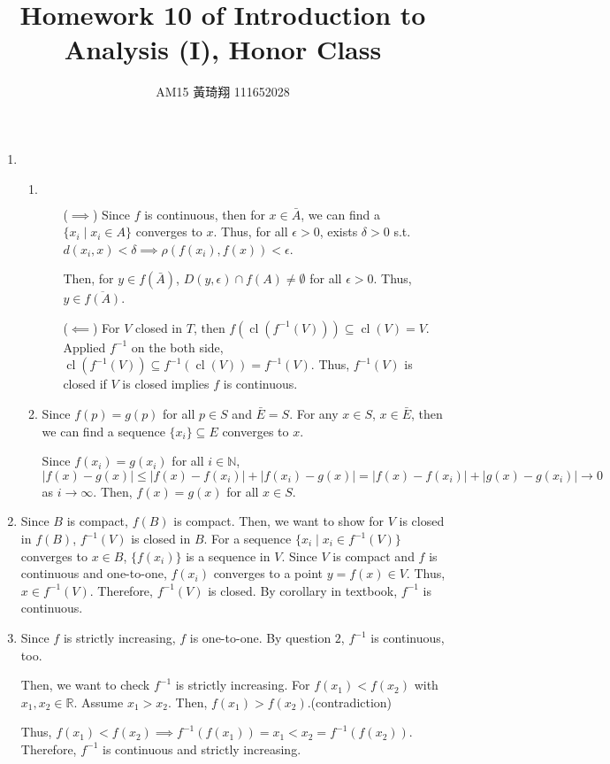 \documentclass[12pt]{article}
\title{Homework 10 of Introduction to Analysis (I), Honor Class}
\author{AM15 黃琦翔 111652028}
\DeclareMathOperator{\closure}{cl}
\begin{document}
\maketitle
\begin{enumerate}
    \item \begin{enumerate}
        \item $\ $
        \begin{enumerate}
            \item[($\implies$)] Since $f$ is continuous, then for $x\in \bar{A}$, 
            we can find a $\lbrace x_i\mid x_i\in A\rbrace$ converges to $x$.
            Thus, for all $\epsilon > 0$, exists $\delta > 0$ s.t. $d(x_i, x) < \delta \implies \rho(f(x_i), f(x)) < \epsilon$.

            Then, for $y \in f(\bar{A})$, $D(y, \epsilon)\cap f(A) \neq \emptyset$ for all $\epsilon > 0$.
            Thus, $y \in \overline{f(A)}$.
            
            \item[($\impliedby$)] For $V$ closed in $T$, then $f(\closure(f^{-1}(V))) \subseteq \closure(V) = V$.
            Applied $f^{-1}$ on the both side, $\closure(f^{-1}(V)) \subseteq f^{-1}(\closure(V)) = f^{-1}(V)$.
            Thus, $f^{-1}(V)$ is closed if $V$ is closed implies $f$ is continuous.           

        \end{enumerate}

        \item Since $f(p) = g(p)$ for all $p \in S$ and $\bar{E} = S$.
        For any $x\in S$, $x\in \bar{E}$, then we can find a sequence $\lbrace x_i\rbrace\subseteq E$ converges to $x$.

        Since $f(x_i) = g(x_i)$ for all $i\in \mathbb{N}$, $|f(x) - g(x)| \leq |f(x) - f(x_i)| + |f(x_i) - g(x)| = |f(x) - f(x_i)| + |g(x)- g(x_i)| \to 0$ as $i\to \infty$.
        Then, $f(x) = g(x)$ for all $x\in S$.
    \end{enumerate}

    \item Since $B$ is compact, $f(B)$ is compact.
    Then, we want to show for $V$ is closed in $f(B)$, $f^{-1}(V)$ is closed in $B$.
    For a sequence $\lbrace x_i\mid x_i \in f^{-1}(V)\rbrace$ converges to $x\in B$,
    $\lbrace f(x_i)\rbrace$ is a sequence in $V$.
    Since $V$ is compact and $f$ is continuous and one-to-one, $f(x_i)$ converges to a point $y = f(x)\in V$.
    Thus, $x \in f^{-1}(V)$.
    Therefore, $f^{-1} (V)$ is closed.
    By corollary in textbook, $f^{-1}$ is continuous.

    \item Since $f$ is strictly increasing, $f$ is one-to-one.
    By question $2$, $f^{-1}$ is continuous, too.

    Then, we want to check $f^{-1}$ is strictly increasing.
    For $f(x_1) < f(x_2)$ with $x_1, x_2 \in \mathbb{R}$.
    Assume $x_1 > x_2$.
    Then, $f(x_1) > f(x_2)$.(contradiction)

    Thus, $f(x_1) < f(x_2)\implies f^{-1}(f(x_1))=x_1 < x_2 = f^{-1}(f(x_2))$.
    Therefore, $f^{-1}$ is continuous and strictly increasing.
    
\end{enumerate}
\end{document}
